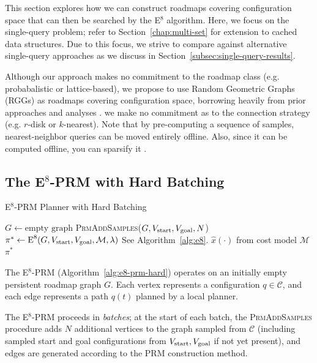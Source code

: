 This section explores how we can construct roadmaps covering
configuration space that can then be searched by the E$^8$ algorithm.
Here,
we focus on the single-query problem;
refer to Section~\ref{chap:multi-set}
for extension to cached data structures.
Due to this focus,
we strive to compare against alternative single-query approaches
as we discuss in Section~\ref{subsec:single-query-results}.

Although
our approach makes no commitment to the roadmap class
(e.g. probabalistic or lattice-based),
we propose to use Random Geometric Graphs (RGGs)
as roadmaps covering configuration space,
borrowing heavily from prior approaches \citep{kavrakietal1996prm}
and analyses \citep{karaman2011samplingoptimal}.
we make no commitment as to the connection strategy
(e.g. $r$-disk or $k$-nearest).
Note that by pre-computing a sequence of samples,
nearest-neighbor queries can be moved entirely offline.
Also,
since it can be computed offline,
you can sparsify it \citep{shaharabani2013sparsification}.

\subsection{The E$^8$-PRM with Hard Batching}

\begin{algorithm}
\caption{E$^8$-PRM Planner with Hard Batching}
\label{alg:e8-prm-hard}
\begin{algorithmic}[1]
\State $G \leftarrow \mbox{empty graph}$
\Loop
   \State \textsc{PrmAddSamples}($G,
      V_{\mbox{\scriptsize start}}, V_{\mbox{\scriptsize goal}},
      N$)
   \State $\pi^* \leftarrow \mbox{E}^8(G,
      V_{\mbox{\scriptsize start}}, V_{\mbox{\scriptsize goal}},
      \mathcal{M}, \lambda)$
      \Comment See Algorithm~\ref{alg:e8}.
      \Comment $\hat{x}(\cdot)$ from cost model $\mathcal{M}$
      \State \Return $\pi^*$
   \EndIf
\EndLoop
\EndProcedure
\end{algorithmic}
\end{algorithm}

The E$^8$-PRM (Algorithm~\ref{alg:e8-prm-hard})
operates on an initially empty persistent roadmap graph $G$.
Each vertex represents a configuration $q \in \mathcal{C}$,
and each edge represents a path $q(t)$ planned by a local planner.

The E$^8$-PRM proceeds in \emph{batches};
at the start of each batch,
the \textsc{PrmAddSamples} procedure adds
$N$ additional vertices to the graph sampled from $\mathcal{C}$
(including sampled start and goal configurations from
$V_{\mbox{\scriptsize start}}, V_{\mbox{\scriptsize goal}}$
if not yet present),
and edges are generated according to the PRM construction method.

